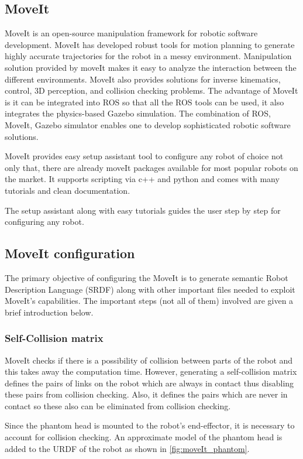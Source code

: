 \subsection{MoveIt} MoveIt is an open-source manipulation framework for robotic software development. MoveIt has developed robust tools for motion planning to generate highly accurate trajectories for the robot in a messy environment. Manipulation solution provided by moveIt makes it easy to analyze the interaction between the different environments. MoveIt also provides solutions for inverse kinematics, control, 3D perception, and collision checking problems. The advantage of MoveIt is it can be integrated into ROS so that all the ROS tools can be used, it also integrates the physics-based Gazebo simulation. The combination of ROS, MoveIt, Gazebo simulator enables one to develop sophisticated robotic software solutions.

\noindent MoveIt provides easy setup assistant tool to configure any robot of choice not only that, there are already moveIt packages available for most popular robots on the market. It supports scripting via c++ and python and comes with many tutorials and clean documentation. 

\noindent The setup assistant along with easy tutorials guides the user step by step for configuring any robot.  

\subsection{MoveIt configuration}The primary objective of configuring the MoveIt is to generate semantic Robot Description Language (SRDF) \cite{SRDF} along with other important files needed to exploit MoveIt's capabilities. The important steps (not all of them) involved are given a brief introduction below.

\subsubsection{Self-Collision matrix} MoveIt checks if there is a possibility of collision between parts of the robot and this takes away the computation time. However, generating a self-collision matrix defines the pairs of links on the robot which are always in contact thus disabling these pairs from collision checking. Also, it defines the pairs which are never in contact so these also can be eliminated from collision checking.  

Since the phantom head is mounted to the robot's end-effector, it is necessary to account for collision checking. An approximate model of the phantom head is added to the URDF of the robot as shown in \cref{fig:moveIt_phantom}.

